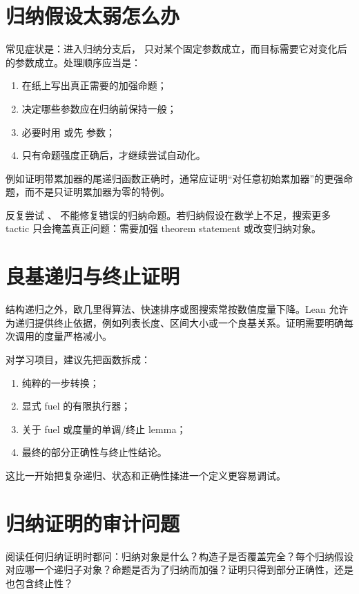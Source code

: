 \section{归纳假设太弱怎么办}

常见症状是：进入归纳分支后， 只对某个固定参数成立，而目标需要它对变化后的参数成立。处理顺序应当是：
\begin{enumerate}
  \item 在纸上写出真正需要的加强命题；
  \item 决定哪些参数应在归纳前保持一般；
  \item 必要时用  或先  参数；
  \item 只有命题强度正确后，才继续尝试自动化。
\end{enumerate}

例如证明带累加器的尾递归函数正确时，通常应证明“对任意初始累加器”的更强命题，而不是只证明累加器为零的特例。

\begin{warningbox}
反复尝试 、 不能修复错误的归纳命题。若归纳假设在数学上不足，搜索更多 tactic 只会掩盖真正问题：需要加强 theorem statement 或改变归纳对象。
\end{warningbox}

\section{良基递归与终止证明}

结构递归之外，欧几里得算法、快速排序或图搜索常按数值度量下降。Lean 允许为递归提供终止依据，例如列表长度、区间大小或一个良基关系。证明需要明确每次调用的度量严格减小。

对学习项目，建议先把函数拆成：
\begin{enumerate}
  \item 纯粹的一步转换；
  \item 显式 fuel 的有限执行器；
  \item 关于 fuel 或度量的单调/终止 lemma；
  \item 最终的部分正确性与终止性结论。
\end{enumerate}
这比一开始把复杂递归、状态和正确性揉进一个定义更容易调试。

\section{归纳证明的审计问题}

阅读任何归纳证明时都问：归纳对象是什么？构造子是否覆盖完全？每个归纳假设对应哪一个递归子对象？命题是否为了归纳而加强？证明只得到部分正确性，还是也包含终止性？

